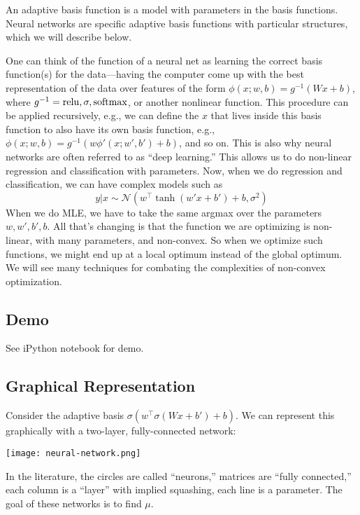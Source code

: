 \documentclass{article}
\begin{document}
An adaptive basis function is a model with parameters in the basis functions. Neural networks are specific adaptive basis functions with particular structures, which we will describe below.

One can think of the function of a neural net as learning the correct basis function(s) for the data---having the computer come up with the best representation of the data over features of the form $\phi(x; w, b) = g^{-1}(Wx + b)$, where $g^{-1} = \operatorname{relu}, \sigma, \operatorname{softmax}$, or another nonlinear function. This procedure can be applied recursively, e.g., we can define the $x$ that lives inside this basis function to also have its own basis function, e.g., $\phi(x; w, b) = g^{-1}(w\phi'(x; w', b') + b)$, and so on. This is also why neural networks are often referred to as ``deep learning.'' This allows us to do non-linear regression and classification with parameters. Now, when we do regression and classification, we can have complex models such as
$$y | x \sim \mathcal{N}(w^\top\tanh(w'x + b') + b, \sigma^2)$$
When we do MLE, we have to take the same argmax over the parameters $w, w', b', b$. All that's changing is that the function we are optimizing is non-linear, with many parameters, and non-convex. So when we optimize such functions, we might end up at a local optimum instead of the global optimum. We will see many techniques for combating the complexities of non-convex optimization.

\subsection{Demo}

See iPython notebook for demo.

\subsection{Graphical Representation}

Consider the adaptive basis $\sigma(w^\top \sigma(Wx + b') + b)$. We can represent this graphically with a two-layer, fully-connected network:

\begin{center}
    \texttt{[image: neural-network.png]}
\end{center}

In the literature, the circles are called ``neurons,'' matrices are ``fully connected,'' each column is a ``layer'' with implied squashing, each line is a parameter. The goal of these networks is to find $\mu$.
\end{document}
